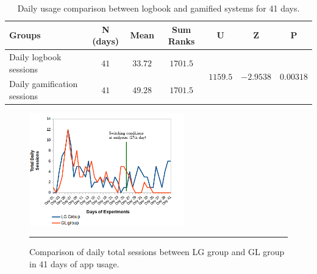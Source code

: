 \begin{table}[h!]
  \begin{center}
    \caption{Daily usage comparison between logbook and gamified systems for 41 days.}
    \label{table:usagedays}
	\begin{tabular}{|L{2.5cm}|c|c|c|c|c|c|}
		\hline
		Groups&N (days)&Mean&Sum Ranks&U&Z&P\\
		\hline
   		Daily logbook sessions&$41$&$33.72$&$1701.5$&&& \\ 
   		 		    Daily gamification sessions&$41$&$49.28$&$1701.5$&&&\\
\hline
	\end{tabular}
  \end{center}
\end{table}

\begin{figure}[htbp]
  \centering
    \includegraphics[width=0.6\textwidth]{Figures/usagedailysessions_lg_gl.png}
    \rule{35em}{0.5pt}
  \caption{Comparison of daily total sessions between LG group and GL group in 41 days of app usage.}
  \label{figure:usagedailysessions_lg_gl}
\end{figure}
